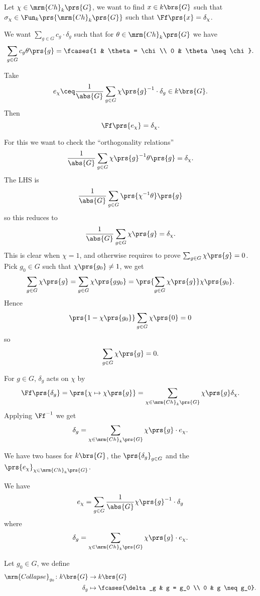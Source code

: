 \documentclass[10pt,a4paper,twoside,openany,hidelinks]{book}
\begin{document}
Let $\chi \in \mrm{Ch}_k\prs{G}$, we want to find $x \in k\brs{G}$ such that $\sigma_{\chi}\in \Fun_k\prs{\mrm{Ch}_k\prs{G}}$ such that $\Ff\prs{x} = \delta_\chi$.

We want $\sum_{g \in G} c_g \cdot \delta_g$ such that for $\theta \in \mrm{Ch}_k\prs{G}$ we have
\[\sum_{g \in G} c_g \theta\prs{g} = \fcases{1 & \theta = \chi \\ 0 & \theta \neq \chi} \text{.}\]


Take
\[e_\chi \ceq \frac{1}{\abs{G}} \sum_{g \in G} \chi\prs{g}^{-1} \cdot \delta_g \in k\brs{G} \text{.}\]
Then
\[\Ff\prs{e_\chi} = \delta_\chi \text{.}\]

For this we want to check the ``orthogonality relations''
\[\frac{1}{\abs{G}} \sum_{g \in G} \chi\prs{g}^{-1} \theta\prs{g} = \delta_\chi \text{.}\]
The LHS is
\[\frac{1}{\abs{G}} \sum_{g \in G} \prs{\chi^{-1}\theta}\prs{g}\]
so this reduces to
\[\frac{1}{\abs{G}} \sum_{g \in G} \chi\prs{g} = \delta_\chi \text{.}\]
This is clear when $\chi = 1$, and otherwise requires to prove $\sum_{g \in G} \chi\prs{g} = 0$.
Pick $g_0 \in G$ such that $\chi\prs{g_0} \neq 1$, we get
\[\sum_{g \in G} \chi\prs{g} = \sum_{g \in G} \chi\prs{g g_0} = \prs{\sum_{g \in G} \chi\prs{g}} \chi\prs{g_0} \text{.}\]
Hence
\[\prs{1 - \chi\prs{g_0}} \sum_{g \in G} \chi\prs{0} = 0\]
so
\[\sum_{g \in G} \chi\prs{g} = 0 \text{.}\]

For $g \in G$, $\delta_g$ acts on $\chi$ by
\[\Ff\prs{\delta_g} = \prs{\chi \mapsto \chi\prs{g}} = \sum_{\chi \in \mrm{Ch}_k\prs{G}} \chi\prs{g} \delta_\chi \text{.}\]
Applying $\Ff^{-1}$ we get
\[\delta_g = \sum_{\chi \in \mrm{Ch}_k\prs{G}} \chi\prs{g} \cdot e_\chi \text{.}\]

\begin{remark}
We have two bases for $k\brs{G}$, the  $\prs{\delta_g}_{g \in G}$ and the  $\prs{e_\chi}_{\chi \in \mrm{Ch}_k\prs{G}}$.

We have
\begin{align*}
e_\chi = \sum_{g \in G} \frac{1}{\abs{G}} \chi\prs{g}^{-1} \cdot \delta_g
\end{align*}
where
\[\delta_g = \sum_{\chi \in \mrm{Ch}_k\prs{G}} \chi\prs{g} \cdot e_\chi \text{.}\]
\end{remark}

\begin{definition}
Let $g_0 \in G$, we define
\begin{align*}
\mrm{Collapse}_{g_0} \colon k\brs{G} &\to k\brs{G} \\
\delta_g &\mapsto \fcases{\delta_g & g = g_0 \\ 0 & g \neq g_0} \text{.}
\end{align*}
\end{definition}
\end{document}
